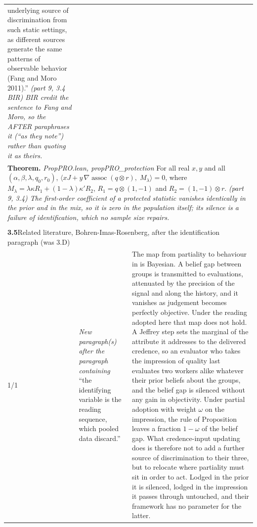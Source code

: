 \documentclass[10pt]{article}
\theoremstyle{definition}
\newcommand{\assoc}{\operatorname{assoc}}
\renewcommand{\ref}[1]{\textsc{\detokenize{#1}}}
\newlength{\fullw}\setlength{\fullw}{25.9cm}
\newcommand{\entryhead}[2]{\multicolumn{3}{|l|}{\rule{0pt}{2.6ex}\large\textbf{#1}\quad #2} \\ \hline}
\begin{document}
{\begin{longtable}{|p{0.9cm}|p{12.2cm}|p{12.2cm}|}
{underlying source of discrimination from such static settings, as different
sources generate the same patterns of observable behavior (Fang and Moro
2011).'' \newline \textit{(part 9, 3.4 BIR) BIR credit the sentence to Fang and Moro, so
the AFTER paraphrases it (``as they note'') rather than quoting it as
theirs.}} \\
\multicolumn{3}{|p{\fullw}|}{\textbf{Theorem.} \textit{PropPRO.lean, propPRO\_protection} \newline For all real $x, y$ and all $(\alpha, \beta, \lambda, q_0, r_0)$,
$\langle xJ + y\,\nabla\assoc(q \otimes r),\; M_\lambda \rangle = 0$, where
$M_\lambda = \lambda\kappa R_1 + (1-\lambda)\kappa' R_2$,
$R_1 = q \otimes (1,-1)$ and $R_2 = (1,-1) \otimes r$. \newline \textit{(part 9, 3.4) The first-order coefficient of a protected
statistic vanishes identically in the prior and in the mix, so it is zero in
the population itself; its silence is a failure of identification, which no
sample size repairs.}} \\ \hline
\multicolumn{3}{|l|}{} \\ \hline
\entryhead{3.5}{Related literature, Bohren-Imas-Rosenberg, after the identification paragraph (was 3.D)\quad{\footnotesize\textit{(formerly E.7)}}}
1/1 & \textit{New paragraph(s) after the paragraph containing} ``the identifying variable is the reading sequence, which pooled data discard.'' & The map from partiality to behaviour in \citet{Bohren2019} is Bayesian. A belief gap between groups is transmitted to evaluations, attenuated by the precision of the signal and along the history, and it vanishes as judgement becomes perfectly objective. Under the reading adopted here that map does not hold. A Jeffrey step sets the marginal of the attribute it addresses to the delivered credence, so an evaluator who takes the impression of quality last evaluates two workers alike whatever their prior beliefs about the groups, and the belief gap is silenced without any gain in objectivity. Under partial adoption with weight $\omega$ on the impression, the rule of Proposition~\ref{prop:LAD} leaves a fraction $1-\omega$ of the belief gap. What credence-input updating does is therefore not to add a further source of discrimination to their three, but to relocate where partiality must sit in order to act. Lodged in the prior it is silenced, lodged in the impression it passes through untouched, and their framework has no parameter for the latter. \\ \hline

\end{longtable}}
\end{document}
